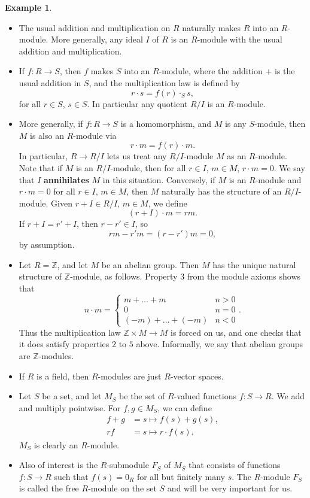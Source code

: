 \documentclass{article}
\newcommand{\Z}{\mathbb{Z}}
\newcommand{\rb}[1]{\left( #1 \right)}
\theoremstyle{definition}\newtheorem{definition}{Definition}[subsection]
\theoremstyle{definition}\newtheorem{remark}[definition]{Remark}
\theoremstyle{definition}\newtheorem*{example}{Example}
\theoremstyle{definition}\newtheorem*{note}{Note}
\begin{document}
\begin{example}
\hfill
\begin{itemize}
\item The usual addition and multiplication on $ R $ naturally makes $ R $ into an $ R $-module. More generally, any ideal $ I $ of $ R $ is an $ R $-module with the usual addition and multiplication.
\item If $ f : R \to S $, then $ f $ makes $ S $ into an $ R $-module, where the addition $ + $ is the usual addition in $ S $, and the multiplication law is defined by
$$ r \cdot s = f\rb{r} \cdot_S s, $$
for all $ r \in S $, $ s \in S $. In particular any quotient $ R / I $ is an $ R $-module.
\item More generally, if $ f : R \to S $ is a homomorphism, and $ M $ is any $ S $-module, then $ M $ is also an $ R $-module via
$$ r \cdot m = f\rb{r} \cdot m. $$
In particular, $ R \to R / I $ lets us treat any $ R / I $-module $ M $ as an $ R $-module. Note that if $ M $ is an $ R / I $-module, then for all $ r \in I $, $ m \in M $, $ r \cdot m = 0 $. We say that $ I $ \textbf{annihilates} $ M $ in this situation. Conversely, if $ M $ is an $ R $-module and $ r \cdot m = 0 $ for all $ r \in I $, $ m \in M $, then $ M $ naturally has the structure of an $ R / I $-module. Given $ r + I \in R / I $, $ m \in M $, we define
$$ \rb{r + I} \cdot m = rm. $$
If $ r + I = r' + I $, then $ r - r' \in I $, so
$$ rm - r'm = \rb{r - r'}m = 0, $$
by assumption.
\item Let $ R = \Z $, and let $ M $ be an abelian group. Then $ M $ has the unique natural structure of $ \Z $-module, as follows. Property $ 3 $ from the module axioms shows that
$$ n \cdot m = \begin{cases}
m + \dots + m & n > 0 \\
0 & n = 0 \\
\rb{-m} + \dots + \rb{-m} & n < 0
\end{cases}. $$
Thus the multiplication law $ \Z \times M \to M $ is forced on us, and one checks that it does satisfy properties $ 2 $ to $ 5 $ above. Informally, we say that abelian groups are $ \Z $-modules.
\item If $ R $ is a field, then $ R $-modules are just $ R $-vector spaces.
\item Let $ S $ be a set, and let $ M_S $ be the set of $ R $-valued functions $ f : S \to R $. We add and multiply pointwise. For $ f, g \in M_S $, we can define
\begin{align*}
f + g & = s \mapsto f\rb{s} + g\rb{s}, \\
rf & = s \mapsto r \cdot f\rb{s}.
\end{align*}
$ M_S $ is clearly an $ R $-module.
\item Also of interest is the $ R $-submodule $ F_S $ of $ M_S $ that consists of functions $ f : S \to R $ such that $ f\rb{s} = 0_R $ for all but finitely many $ s $. The $ R $-module $ F_S $ is called the free $ R $-module on the set $ S $ and will be very important for us.
\end{itemize}
\end{example}
\end{document}
